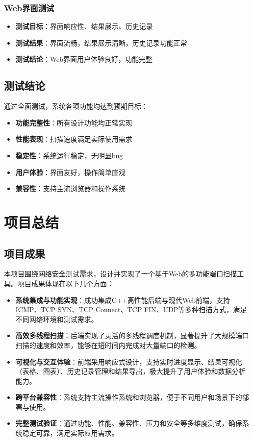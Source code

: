 \documentclass[12pt,hyperref,a4paper,UTF8]{ctexart}
\begin{document}
\subsubsection{Web界面测试}
\begin{itemize}
    \item \textbf{测试目标}：界面响应性、结果展示、历史记录
    \item \textbf{测试结果}：界面流畅，结果展示清晰，历史记录功能正常
    \item \textbf{测试结论}：Web界面用户体验良好，功能完整
\end{itemize}

\subsection{测试结论}
通过全面测试，系统各项功能均达到预期目标：
\begin{itemize}
    \item \textbf{功能完整性}：所有设计功能均正常实现
    \item \textbf{性能表现}：扫描速度满足实际使用需求
    \item \textbf{稳定性}：系统运行稳定，无明显bug
    \item \textbf{用户体验}：界面友好，操作简单直观
    \item \textbf{兼容性}：支持主流浏览器和操作系统
\end{itemize}


\section{项目总结}

\subsection{项目成果}
本项目围绕网络安全测试需求，设计并实现了一个基于Web的多功能端口扫描工具。项目成果体现在以下几个方面：
\begin{itemize}
    \item \textbf{系统集成与功能实现}：成功集成C++高性能后端与现代Web前端，支持ICMP、TCP SYN、TCP Connect、TCP FIN、UDP等多种扫描方式，满足不同网络环境和测试需求。
    \item \textbf{高效多线程扫描}：后端实现了灵活的多线程调度机制，显著提升了大规模端口扫描的速度和效率，能够在短时间内完成对大量端口的检测。
    \item \textbf{可视化与交互体验}：前端采用响应式设计，支持实时进度显示、结果可视化（表格、图表）、历史记录管理和结果导出，极大提升了用户体验和数据分析能力。
    \item \textbf{跨平台兼容性}：系统支持主流操作系统和浏览器，便于不同用户和场景下的部署与使用。
    \item \textbf{完整测试验证}：通过功能、性能、兼容性、压力和安全等多维度测试，确保系统稳定可靠，满足实际应用需求。
\end{itemize}
\end{document}
